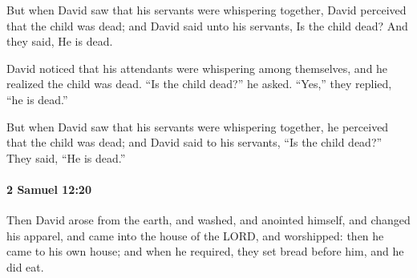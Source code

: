 			\begin{versebox}
					\item[BHS] 
					\item[ASV] But when David saw that his servants were whispering together, David perceived that the child was dead; and David said unto his servants, Is the child dead? And they said, He is dead.
					\item[NIV] David noticed that his attendants were whispering among themselves, and he realized the child was dead. “Is the child dead?” he asked. “Yes,” they replied, “he is dead.”
					\item[NRSV] But when David saw that his servants were whispering together, he perceived that the child was dead; and David said to his servants, “Is the child dead?” They said, “He is dead.”
			\end{versebox}

		\paragraph{2 Samuel 12:20} %
			\label{2SAMUEL-12-20}

			Then David arose from the earth, and washed, and anointed himself, and changed his apparel, and came into the house of the LORD, and worshipped: then he came to his own house; and when he required, they set bread before him, and he did eat.

